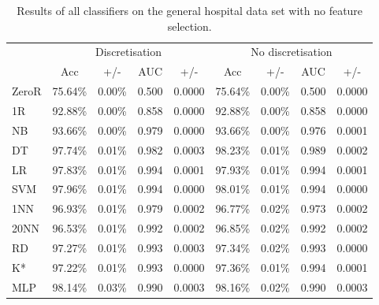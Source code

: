 \begin{table}[htbp]
\caption{Results of all classifiers on the general hospital data set with no feature selection.}
\begin{tabular}{|l|cccc|cccc|}
\hline
 & \multicolumn{ 4}{c|}{Discretisation} & \multicolumn{ 4}{c|}{No discretisation} \\
 & Acc & +/- & \multicolumn{1}{c}{AUC} & \multicolumn{1}{c|}{+/-} & Acc & +/- & \multicolumn{1}{c}{AUC} & \multicolumn{1}{c|}{+/-} \\ \hline
  ZeroR & 75.64\% & 0.00\% & 0.500 & 0.0000 & 75.64\% & 0.00\% & 0.500 & 0.0000 \\ 
  1R & 92.88\% & 0.00\% & 0.858 & 0.0000 & 92.88\% & 0.00\% & 0.858 & 0.0000 \\ 
  NB & 93.66\% & 0.00\% & 0.979 & 0.0000 & 93.66\% & 0.00\% & 0.976 & 0.0001 \\ 
  DT & 97.74\% & 0.01\% & 0.982 & 0.0003 & 98.23\% & 0.01\% & 0.989 & 0.0002 \\ 
  LR & 97.83\% & 0.01\% & 0.994 & 0.0001 & 97.93\% & 0.01\% & 0.994 & 0.0001 \\ 
  SVM & 97.96\% & 0.01\% & 0.994 & 0.0000 & 98.01\% & 0.01\% & 0.994 & 0.0000 \\ 
  1NN & 96.93\% & 0.01\% & 0.979 & 0.0002 & 96.77\% & 0.02\% & 0.973 & 0.0002 \\ 
  20NN & 96.53\% & 0.01\% & 0.992 & 0.0002 & 96.85\% & 0.02\% & 0.992 & 0.0002 \\ 
  RD & 97.27\% & 0.01\% & 0.993 & 0.0003 & 97.34\% & 0.02\% & 0.993 & 0.0000 \\ 
  K* & 97.22\% & 0.01\% & 0.993 & 0.0000 & 97.36\% & 0.01\% & 0.994 & 0.0001 \\ 
  MLP & 98.14\% & 0.03\% & 0.990 & 0.0003 & 98.16\% & 0.02\% & 0.990 & 0.0003 \\ \hline
\end{tabular}
\end{table}
